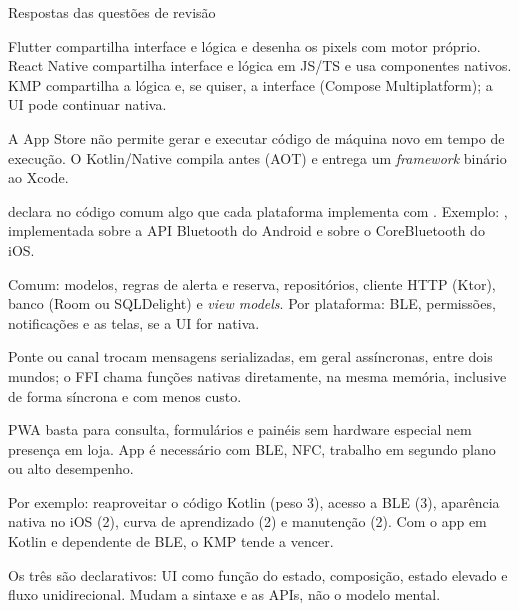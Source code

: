 \documentclass[aspectratio=169,10pt]{beamer}
\begin{document}
\begin{frame}{Respostas das questões de revisão}
  \begin{respostas}
    \item Flutter compartilha interface e lógica e desenha os pixels com motor próprio. React Native compartilha interface e lógica em JS/TS e usa componentes nativos. KMP compartilha a lógica e, se quiser, a interface (Compose Multiplatform); a UI pode continuar nativa.
    \item A App Store não permite gerar e executar código de máquina novo em tempo de execução. O Kotlin/Native compila antes (AOT) e entrega um \emph{framework} binário ao Xcode.
    \item {} declara no código comum algo que cada plataforma implementa com . Exemplo: , implementada sobre a API Bluetooth do Android e sobre o CoreBluetooth do iOS.
    \item Comum: modelos, regras de alerta e reserva, repositórios, cliente HTTP (Ktor), banco (Room ou SQLDelight) e \emph{view models}. Por plataforma: BLE, permissões, notificações e as telas, se a UI for nativa.
    \item Ponte ou canal trocam mensagens serializadas, em geral assíncronas, entre dois mundos; o FFI chama funções nativas diretamente, na mesma memória, inclusive de forma síncrona e com menos custo.
    \item PWA basta para consulta, formulários e painéis sem hardware especial nem presença em loja. App é necessário com BLE, NFC, trabalho em segundo plano ou alto desempenho.
    \item Por exemplo: reaproveitar o código Kotlin (peso 3), acesso a BLE (3), aparência nativa no iOS (2), curva de aprendizado (2) e manutenção (2). Com o app em Kotlin e dependente de BLE, o KMP tende a vencer.
    \item Os três são declarativos: UI como função do estado, composição, estado elevado e fluxo unidirecional. Mudam a sintaxe e as APIs, não o modelo mental.
  \end{respostas}
\end{frame}

\end{document}
